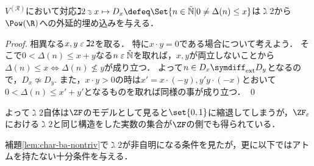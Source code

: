 \documentclass[realisability.tex]{subfiles}
\begin{document}
\begin{lemma}\label{lem:D-base-ext-inj}
 $V^{(\mathcal{R})}$において対応$\gimel 2 \strni x \mapsto D_x \defeq \Set{n \in \NN | 0 \neq \Delta(n) \leq x}$は$\gimel2$から$\Pow(\R)$への外延的埋め込みを与える．
\end{lemma}
\begin{proof}
 相異なる$x, y \mathrel{\varepsilon} \gimel 2$を取る．
 特に$x \cdot y = 0$である場合について考えよう．
 そこで$0 < \Delta(n) \leq x + y$なる$n \mathrel{\varepsilon} \mathord{\tilde{\mathbb{N}}}$を取れば，$x, y$が両立しないことから$\Delta(n) \leq x \iff \Delta(n) \nleq y$が成り立つ．
 よって$n \in D_x \symdiff_{\text{ext}} D_y$となるので，$D_x \not\simeq D_y$.
 また，$x \cdot y > 0$の時は$x' = x \cdot (- y), y' y \cdot (- x)$とおいて$0 < \Delta(n) \leq x' + y'$となるものを取れば同様の事が成り立つ． \qed
\end{proof}
よって$\gimel 2$自体は$\ZF$のモデルとして見ると$\set{0, 1}$に縮退してしまうが，$\ZFe$における$\gimel 2$と同じ構造をした実数の集合が$\ZF$の側でも得られている．

補題\ref{lem:char-ba-nontriv}で$\gimel2$が非自明になる条件を見たが，更に以下ではアトムを持たない十分条件を与える．
\end{document}
